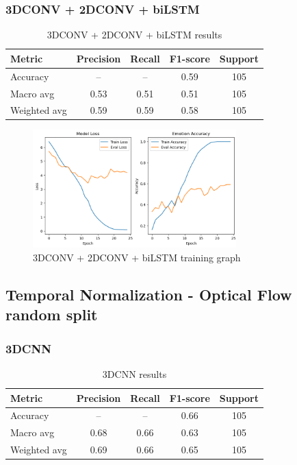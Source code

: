 \documentclass{article}
\begin{document}
\subsubsection{3DCONV + 2DCONV + biLSTM}

\begin{table}[H]
\centering
\caption{3DCONV + 2DCONV + biLSTM results}
\begin{tabular}{|l|c|c|c|c|}
\hline
\textbf{Metric} & \textbf{Precision} & \textbf{Recall} & \textbf{F1-score} & \textbf{Support} \\
\hline
Accuracy       & --   & --   & 0.59 & 105 \\
Macro avg      & 0.53 & 0.51 & 0.51 & 105 \\
Weighted avg   & 0.59 & 0.59 & 0.58 & 105 \\
\hline
\end{tabular}%
\label{tab:table2}
\end{table}

\begin{figure}[H]
  \begin{center}
    \includegraphics*[width=0.7\textwidth]{Figures/Picture6.png}
  \end{center}
  \caption{3DCONV + 2DCONV + biLSTM training graph}
  \label{fig:fig6}
\end{figure}

\subsection{Temporal Normalization - Optical Flow random split}
\subsubsection{3DCNN}

\begin{table}[H]
\centering
\caption{3DCNN results}
\begin{tabular}{|l|c|c|c|c|}
\hline
\textbf{Metric} & \textbf{Precision} & \textbf{Recall} & \textbf{F1-score} & \textbf{Support} \\
\hline
Accuracy       & --   & --   & 0.66 & 105 \\
Macro avg      & 0.68 & 0.66 & 0.63 & 105 \\
Weighted avg   & 0.69 & 0.66 & 0.65 & 105 \\
\hline
\end{tabular}%
\label{tab:table3}
\end{table}
\end{document}
